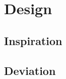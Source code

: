 \documentclass{beamer}
\begin{document}


\section{Design}
\subsection{Inspiration}
\subsection{Deviation}

\end{document}

